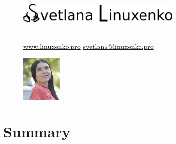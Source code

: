 \documentclass[a4paper,13pt]{article}
\begin{document}
\begin{figure}
  \begin{minipage}{0.30\textwidth}
    {\includegraphics[height=28pt]{s}}
  \end{minipage}
  \begin{minipage}{0.55\textwidth}
    \flushright
    \\\bigskip\break
    {\hspace{22pt}\break
    \small{
    \href{https://www.linuxenko.pro}{www.linuxenko.pro}\hspace{22pt}\break
    \href{mailto:svetlana@linuxenko.pro}{svetlana@linuxenko.pro}\hspace{22pt}\break
  }}
  \end{minipage}
  \begin{minipage}{0.10\textwidth}
    {\includegraphics[height=64pt]{pic}}
  \end{minipage}
\end{figure}


%

\section*{Summary}
\end{document}
